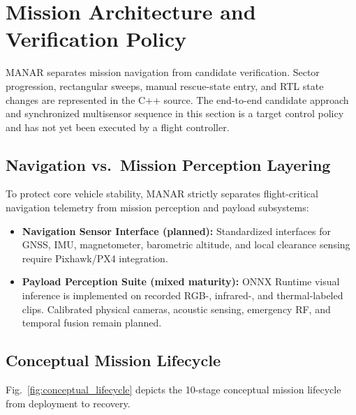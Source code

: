 \section{Mission Architecture and Verification Policy}

MANAR separates mission navigation from candidate verification. Sector progression, rectangular sweeps, manual rescue-state entry, and RTL state changes are represented in the C++ source. The end-to-end candidate approach and synchronized multisensor sequence in this section is a target control policy and has not yet been executed by a flight controller.

\subsection{Navigation vs.\ Mission Perception Layering}
To protect core vehicle stability, MANAR strictly separates flight-critical navigation telemetry from mission perception and payload subsystems:
\begin{itemize}
    \item \textbf{Navigation Sensor Interface (planned):} Standardized interfaces for GNSS, IMU, magnetometer, barometric altitude, and local clearance sensing require Pixhawk/PX4 integration.
    \item \textbf{Payload Perception Suite (mixed maturity):} ONNX Runtime visual inference is implemented on recorded RGB-, infrared-, and thermal-labeled clips. Calibrated physical cameras, acoustic sensing, emergency RF, and temporal fusion remain planned.
\end{itemize}

\subsection{Conceptual Mission Lifecycle}
Fig.~\ref{fig:conceptual_lifecycle} depicts the 10-stage conceptual mission lifecycle from deployment to recovery.

